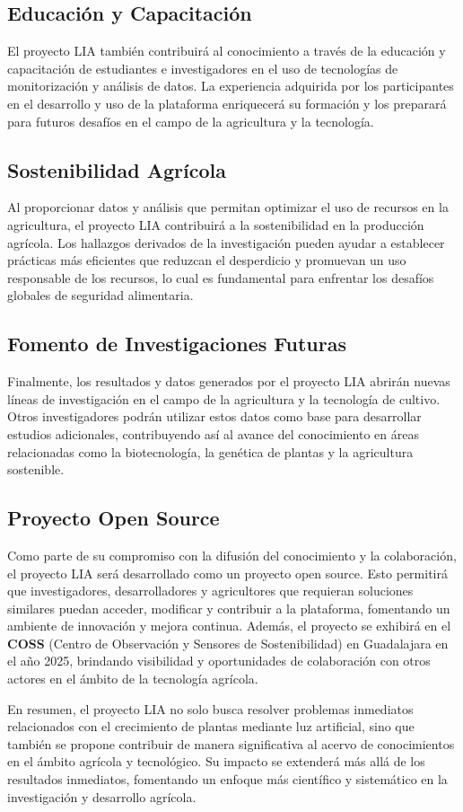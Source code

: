 \subsection{Educación y Capacitación}
El proyecto LIA también contribuirá al conocimiento a través de la educación y capacitación de estudiantes e investigadores en el uso de tecnologías de monitorización y análisis de datos. La experiencia adquirida por los participantes en el desarrollo y uso de la plataforma enriquecerá su formación y los preparará para futuros desafíos en el campo de la agricultura y la tecnología.

\subsection{Sostenibilidad Agrícola}
Al proporcionar datos y análisis que permitan optimizar el uso de recursos en la agricultura, el proyecto LIA contribuirá a la sostenibilidad en la producción agrícola. Los hallazgos derivados de la investigación pueden ayudar a establecer prácticas más eficientes que reduzcan el desperdicio y promuevan un uso responsable de los recursos, lo cual es fundamental para enfrentar los desafíos globales de seguridad alimentaria.

\subsection{Fomento de Investigaciones Futuras}
Finalmente, los resultados y datos generados por el proyecto LIA abrirán nuevas líneas de investigación en el campo de la agricultura y la tecnología de cultivo. Otros investigadores podrán utilizar estos datos como base para desarrollar estudios adicionales, contribuyendo así al avance del conocimiento en áreas relacionadas como la biotecnología, la genética de plantas y la agricultura sostenible.

\subsection{Proyecto Open Source}
Como parte de su compromiso con la difusión del conocimiento y la colaboración, el proyecto LIA será desarrollado como un proyecto open source. Esto permitirá que investigadores, desarrolladores y agricultores que requieran soluciones similares puedan acceder, modificar y contribuir a la plataforma, fomentando un ambiente de innovación y mejora continua. Además, el proyecto se exhibirá en el \textbf{COSS} (Centro de Observación y Sensores de Sostenibilidad) en Guadalajara en el año 2025, brindando visibilidad y oportunidades de colaboración con otros actores en el ámbito de la tecnología agrícola.

En resumen, el proyecto LIA no solo busca resolver problemas inmediatos relacionados con el crecimiento de plantas mediante luz artificial, sino que también se propone contribuir de manera significativa al acervo de conocimientos en el ámbito agrícola y tecnológico. Su impacto se extenderá más allá de los resultados inmediatos, fomentando un enfoque más científico y sistemático en la investigación y desarrollo agrícola.
